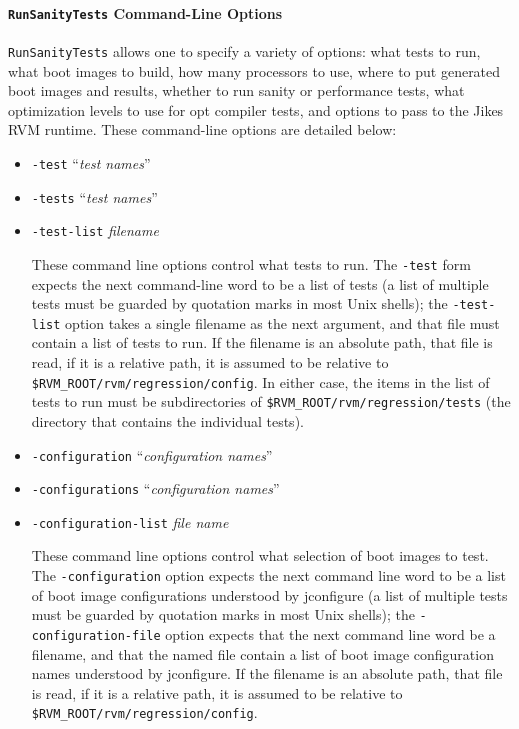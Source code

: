 \paragraph{{\tt{RunSanityTests}} Command-Line Options}

 {\tt{RunSanityTests}} allows one to specify a variety of options:
what tests to run, what boot images to build, how many processors to
use, where to put generated boot images and results, whether to run
sanity or performance tests, what optimization levels to use for opt
compiler tests, and options to pass to the Jikes RVM runtime.  These
command-line options are detailed below:

\begin{itemize}
\item{\tt{-test}} ``{\em{test names}}''
\item{\tt{-tests}} ``{\em{test names}}''
\item{\tt{-test-list}} {\em{filename}}

 These command line options control what tests to run.  The
{\tt{-test}} form expects the next command-line word to be a list
of tests (a list of multiple tests must be guarded by quotation marks
in most Unix shells); the {\tt{-test-list}} option takes a single
filename as the next argument, and that file must contain a list of
tests to run.  If the filename is an absolute path, that file is read,
if it is a relative path, it is assumed to be relative to
{\tt \$RVM\_\-ROOT/rvm/regression/config}.  In either case, the items in the
list of tests to run must be subdirectories of
{\tt \$RVM\_\-ROOT/rvm/regression/tests} (the directory that contains the
individual tests).

\item{\tt{-configuration}} ``{\em{configuration names}}''
\item{\tt{-configurations}} ``{\em{configuration names}}''
\item{\tt{-configuration-list}} {\em{file name}}

 These command line options control what selection of boot images to
test.  The {\tt{-configuration}} option expects the next command
line word to be a list of boot image configurations understood by
jconfigure (a list of multiple tests must be guarded by quotation
marks in most Unix shells); the {\tt{-configuration-file}} option
expects that the next command line word be a filename, and that the
named file contain a list of boot image configuration names understood
by jconfigure.  If the filename is an absolute path, that file is
read, if it is a relative path, it is assumed to be relative to
{\tt \$RVM\_\-ROOT/rvm/regression/config}.


\end{itemize}
